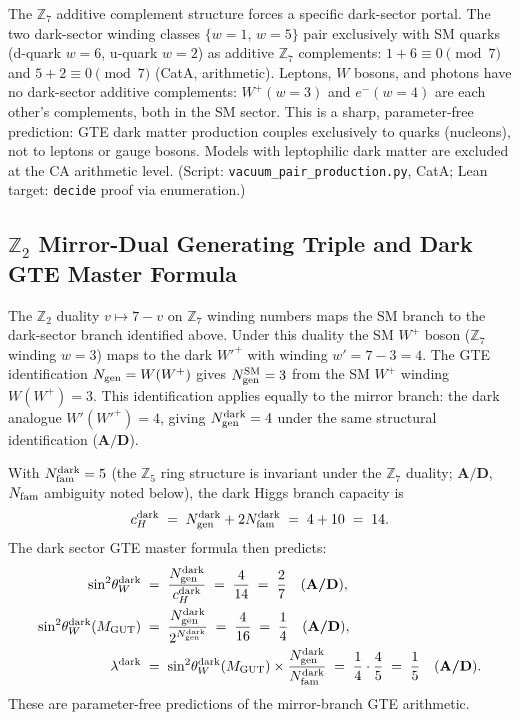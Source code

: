 \documentclass[11pt]{article}
\newcommand{\CatAD}{\textbf{A/D}}
\begin{document}
The $\mathbb{Z}_7$ additive complement structure forces a specific dark-sector portal.
The two dark-sector winding classes $\{w=1,\,w=5\}$ pair exclusively with SM quarks
(d-quark $w=6$, u-quark $w=2$) as additive $\mathbb{Z}_7$ complements:
$1+6 \equiv 0\pmod{7}$ and $5+2\equiv 0\pmod{7}$ (CatA, arithmetic).
Leptons, $W$ bosons, and photons have no dark-sector additive complements:
$W^+(w=3)$ and $e^-(w=4)$ are each other's complements, both in the SM sector.
This is a sharp, parameter-free prediction: GTE dark matter production couples
exclusively to quarks (nucleons), not to leptons or gauge bosons.
Models with leptophilic dark matter are excluded at the CA arithmetic level.
(Script: \texttt{vacuum\_pair\_production.py}, CatA; Lean target:
\texttt{decide} proof via enumeration.)

\subsection{$\mathbb{Z}_2$ Mirror-Dual Generating Triple and Dark GTE Master Formula}
\label{ssec:dark_gte_master}

The $\mathbb{Z}_2$ duality $v \mapsto 7-v$ on $\mathbb{Z}_7$ winding numbers maps the SM branch
to the dark-sector branch identified above.
Under this duality the SM $W^+$ boson ($\mathbb{Z}_7$ winding $w=3$) maps to the dark
$W'^+$ with winding $w'= 7-3 = 4$.
The GTE identification $N_{\rm gen} = W(W^+)$ gives $N_{\rm gen}^{\rm SM} = 3$ from the SM $W^+$ winding $W(W^+)=3$.
This identification applies equally to the mirror branch: the dark analogue $W'({W'}^+)=4$, giving $N_{\rm gen}^{\rm dark} = 4$ under the same structural identification ($\CatAD$).

With $N_{\rm fam}^{\rm dark} = 5$ (the $\mathbb{Z}_5$ ring structure is invariant under
the $\mathbb{Z}_7$ duality; $\CatAD$, $N_{\rm fam}$ ambiguity noted below),
the dark Higgs branch capacity is
\begin{equation}
  c_H^{\rm dark} \;=\; N_{\rm gen}^{\rm dark} + 2N_{\rm fam}^{\rm dark}
                  \;=\; 4 + 10 \;=\; 14.
\end{equation}
The dark sector GTE master formula then predicts:
\begin{align}
  \sin^2\!\theta_W^{\rm dark}
    &\;=\; \frac{N_{\rm gen}^{\rm dark}}{c_H^{\rm dark}}
     \;=\; \frac{4}{14} \;=\; \frac{2}{7} \quad \text{(\CatAD{})}, \\
  \sin^2\!\theta_W^{\rm dark}(M_{\rm GUT})
    &\;=\; \frac{N_{\rm gen}^{\rm dark}}{2^{N_{\rm gen}^{\rm dark}}}
     \;=\; \frac{4}{16} \;=\; \frac{1}{4} \quad \text{(\CatAD{})}, \\
  \lambda^{\rm dark}
    &\;=\; \sin^2\!\theta_W^{\rm dark}(M_{\rm GUT})
           \times \frac{N_{\rm gen}^{\rm dark}}{N_{\rm fam}^{\rm dark}}
     \;=\; \frac{1}{4}\cdot\frac{4}{5} \;=\; \frac{1}{5} \quad \text{(\CatAD{})}.
\end{align}
These are parameter-free predictions of the mirror-branch GTE arithmetic.
\end{document}
